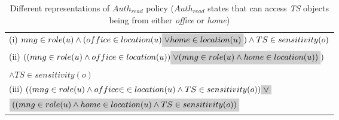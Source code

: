 

 \newcommand{\highlight}[1]{%
 	\colorbox{black!19}{$\displaystyle#1$}}
 
\begin{table}
	\centering
	\caption{ Different representations of  $Auth_{read}$ policy  ($Auth_{read}$ states that \textit{\manager} can access \textit{TS} objects being from either \textit{office} or \textit{home})} 
	\label{tab:LAP-heterogeneity}
	\begin{tabular}{|l|}						
		\hline					
			
			(i) $  \manager \in role(u) \land (office \in location(u) \highlight {\lor home \in location(u)})  \land TS \in sensitivity(o)$ \\
			(ii) $((\manager \in role(u) \land office \in location(u) ) \highlight {\lor (\manager \in role(u) \land home \in location(u) )}  )$ \\ \hfill $ \land TS \in sensitivity(o)$\\
			(iii) $((\manager \in role(u) \land office \mathbf{\in}\in location(u) \land TS \in sensitivity(o) ) \highlight{\lor}$  \\ \hfill $\highlight{((\manager \in role(u) \land home \in location(u) \land TS \in sensitivity(o) )}$ \\
		 \hline	
	\end{tabular}	

	
\end{table}
